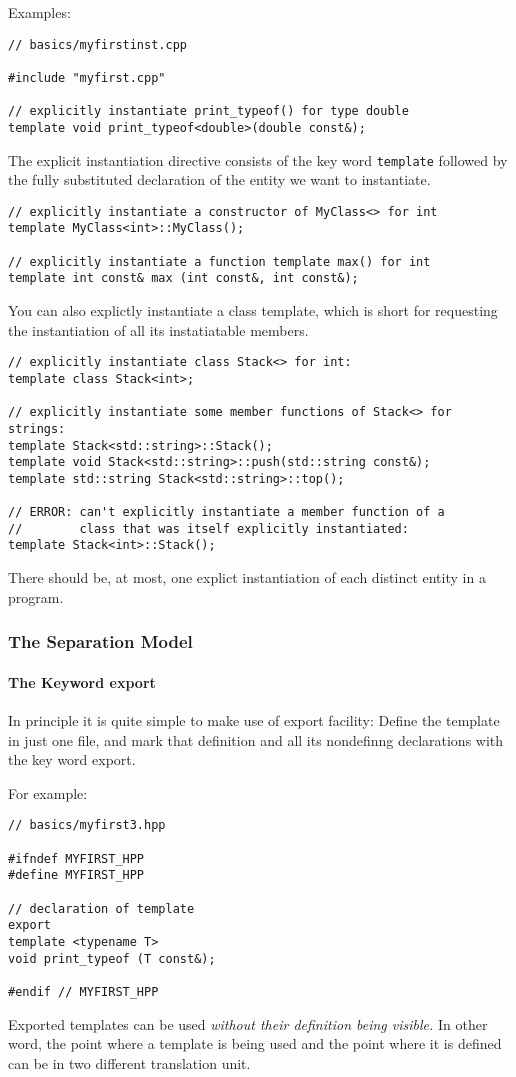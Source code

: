 \documentclass[a4paper,12pt]{book}
\begin{document}
Examples:
\begin{verbatim}
// basics/myfirstinst.cpp 

#include "myfirst.cpp" 

// explicitly instantiate print_typeof() for type double 
template void print_typeof<double>(double const&); 
\end{verbatim}
The explicit instantiation directive consists of the key word \verb|template| followed by the fully substituted declaration of the entity we want to instantiate.
\begin{verbatim}
// explicitly instantiate a constructor of MyClass<> for int 
template MyClass<int>::MyClass(); 

// explicitly instantiate a function template max() for int 
template int const& max (int const&, int const&); 
\end{verbatim}
You can also explictly instantiate a class template, which is short for requesting the instantiation of all its instatiatable members. 
\begin{verbatim}
// explicitly instantiate class Stack<> for int: 
template class Stack<int>; 

// explicitly instantiate some member functions of Stack<> for strings: 
template Stack<std::string>::Stack(); 
template void Stack<std::string>::push(std::string const&); 
template std::string Stack<std::string>::top(); 

// ERROR: can't explicitly instantiate a member function of a 
//        class that was itself explicitly instantiated: 
template Stack<int>::Stack(); 
\end{verbatim}
There should be, at most, one explict instantiation of each distinct entity in a program.
\subsubsection{The Separation Model}
\paragraph{The Keyword export}

In principle it is quite simple to make use of export facility: Define the template in just one file, and mark that definition and all its nondefinng declarations with the key word export. 

For example:
\begin{verbatim}
// basics/myfirst3.hpp 

#ifndef MYFIRST_HPP 
#define MYFIRST_HPP 

// declaration of template 
export 
template <typename T> 
void print_typeof (T const&); 

#endif // MYFIRST_HPP 
\end{verbatim}
Exported templates can be used \emph{without their definition being visible.} In other word, the point where a template is being used and the point where it is defined can be in two different translation unit. 
\end{document}
